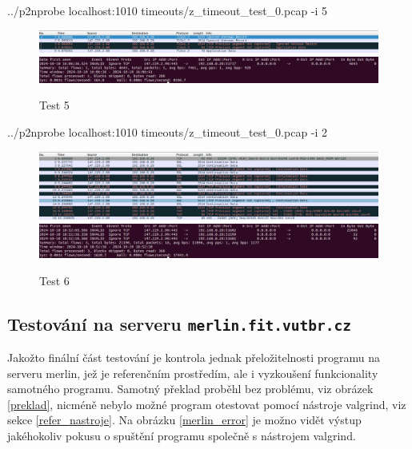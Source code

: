 \documentclass[11pt, a4paper, hidelinks]{article}[08.10.2023]
\begin{document}
    \begin{center}
        ../p2nprobe localhost:1010 timeouts/z\_timeout\_test\_0.pcap -i 5
    \end{center}
    \begin{figure}[H]
        \centering
        \includegraphics[width=1\linewidth]{pictures/test_5_data.png}
        \includegraphics[width=1\linewidth]{pictures/test_5_res.png}
        \caption{Test 5}
    \end{figure}

    \begin{center}
        ../p2nprobe localhost:1010 timeouts/z\_timeout\_test\_0.pcap -i 2
    \end{center}
    \begin{figure}[H]
        \centering
        \includegraphics[width=1\linewidth]{pictures/test_6_data.png}
        \includegraphics[width=1\linewidth]{pictures/test_6_res.png}
        \caption{Test 6}
    \end{figure}

    \subsection{Testování na serveru \texttt{merlin.fit.vutbr.cz}}\label{test_merlin}
    Jakožto finální část testování je kontrola jednak přeložitelnosti programu na serveru merlin, jež je referenčním prostředím, ale i vyzkoušení funkcionality samotného programu. Samotný překlad proběhl bez problému, viz obrázek \ref{preklad}, nicméně nebylo možné program otestovat pomocí nástroje valgrind, viz sekce \ref{refer_nastroje}. Na obrázku \ref{merlin_error} je možno vidět výstup jakéhokoliv pokusu o spuštění programu společně s nástrojem valgrind.
\end{document}
